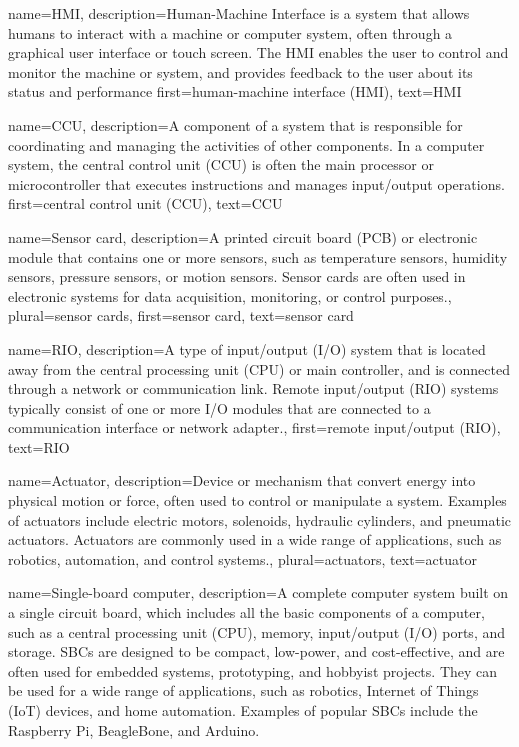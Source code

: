 {
    name={HMI},
    description={Human-Machine Interface is a system that allows humans to interact
    with a machine or computer system,
    often through a graphical user interface or touch screen.
    The HMI enables the user to control and monitor the machine or system,
    and provides feedback to the user about its status and performance}
    first={human-machine interface (HMI)},
    text={HMI}
}

{
    name={CCU}, 
    description={A component of a system that is responsible for coordinating
    and managing the activities of other components.
    In a computer system, the central control unit (CCU) is often
    the main processor or microcontroller that executes instructions
    and manages input/output operations.}
    first={central control unit (CCU)},
    text={CCU}
}

{
    name={Sensor card},
    description={A printed circuit board (PCB) or electronic module
    that contains one or more sensors,
    such as temperature sensors, humidity sensors,
    pressure sensors, or motion sensors.
    Sensor cards are often used in electronic systems for data acquisition,
    monitoring, or control purposes.},
    plural={sensor cards},
    first={sensor card},
    text={sensor card}
}

{
    name={RIO},
    description={A type of input/output (I/O) system that is located away from the central processing unit (CPU) or main controller, and is connected through a network or communication link. Remote input/output (RIO) systems typically consist of one or more I/O modules that are connected to a communication interface or network adapter.},
    first={remote input/output (RIO)},
    text={RIO}
}

{
    name={Actuator},
    description={Device or mechanism that convert energy into physical motion or force, often used to control or manipulate a system. Examples of actuators include electric motors, solenoids, hydraulic cylinders, and pneumatic actuators. Actuators are commonly used in a wide range of applications, such as robotics, automation, and control systems.},
    plural={actuators},
    text={actuator}
}

{
    name={Single-board computer},
    description={A complete computer system built on a single circuit board, which includes all the basic components of a computer, such as a central processing unit (CPU), memory, input/output (I/O) ports, and storage. SBCs are designed to be compact, low-power, and cost-effective, and are often used for embedded systems, prototyping, and hobbyist projects. They can be used for a wide range of applications, such as robotics, Internet of Things (IoT) devices, and home automation. Examples of popular SBCs include the Raspberry Pi, BeagleBone, and Arduino.}
}

